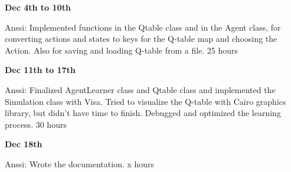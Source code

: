 \documentclass{article}
\begin{document}
\textbf{Dec 4th to 10th}

Anssi:
Implemented functions in the Qtable class and in the Agent class, for converting actions and states to keys for the Q-table map and choosing the Action. Also for saving and loading Q-table from a file.
25 hours

\textbf{Dec 11th to 17th}

Anssi:
Finalized AgentLearner class and Qtable class and implemented the Simulation class with Visa. Tried to visualize the Q-table with Cairo graphics library, but didn’t have time to finish. Debugged and optimized  the learning process.
30 hours

\textbf{Dec 18th}

Anssi:
Wrote the documentation.
x hours
\end{document}
